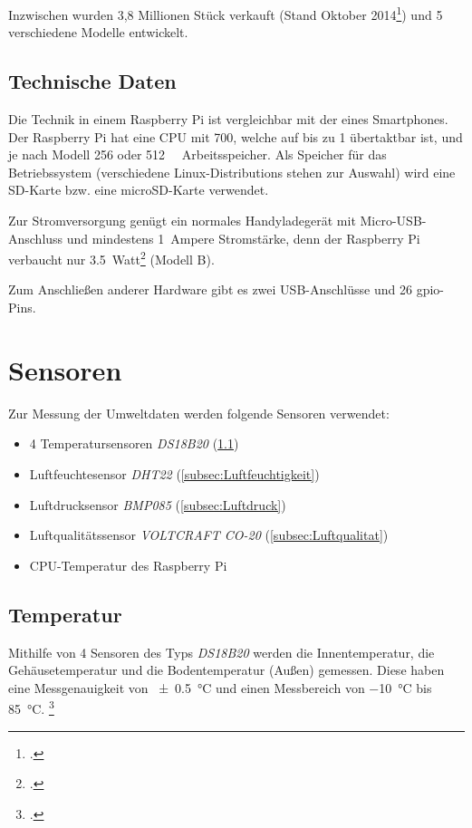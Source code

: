Inzwischen wurden 3,8 Millionen Stück verkauft (Stand Oktober 2014\footcite{verkauf}) und 5 verschiedene Modelle entwickelt.

\subsection{Technische Daten}
\label{subsec:Technische Daten}
Die Technik in einem Raspberry Pi ist vergleichbar mit der eines Smartphones. Der Raspberry Pi hat eine \gls{CPU} mit \SI{700}{}, welche auf bis zu \SI{1}{} übertaktbar ist, und je nach Modell \SI{256}{} oder \SI{512}{\mega\byte} Arbeitsspeicher. Als Speicher für das Betriebssystem (verschiedene \glspl{Linux-Distribution} stehen zur Auswahl) wird eine SD-Karte bzw. eine microSD-Karte verwendet.

Zur Stromversorgung genügt ein normales Handyladegerät mit Micro-USB-Anschluss und mindestens \SI{1}{\gls{Ampere}} Stromstärke, denn der Raspberry Pi verbaucht nur \SI{3.5}{Watt}\footcite{strom} (Modell B).

Zum Anschließen anderer Hardware gibt es zwei USB-Anschlüsse und 26 \gls{gpio}-Pins.

\section{Sensoren}
\label{sec:Sensoren}

Zur Messung der Umweltdaten werden folgende Sensoren verwendet:
\begin{itemize}
\item 4 Temperatursensoren \emph{DS18B20} (\ref{subsec:Temperatur})
\item Luftfeuchtesensor \emph{DHT22} (\ref{subsec:Luftfeuchtigkeit})
\item Luftdrucksensor \emph{BMP085} (\ref{subsec:Luftdruck})
\item Luftqualitätssensor \emph{VOLTCRAFT CO-20} (\ref{subsec:Luftqualitat})
\item\gls{CPU}-Temperatur des Raspberry Pi
\end{itemize}
\subsection{Temperatur}
\label{subsec:Temperatur}

Mithilfe von 4 Sensoren des Typs \emph{DS18B20} werden die Innentemperatur, die Gehäusetemperatur und die Bodentemperatur (Außen) gemessen. Diese haben eine Messgenauigkeit von \SI{\pm 0.5}{\degreeCelsius}  und einen Messbereich von \SI{-10}{\degreeCelsius}  bis \SI{+85}{\degreeCelsius}. \footcite[20]{temp}

